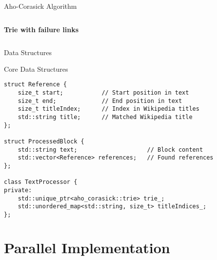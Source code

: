 \documentclass[aspectratio=169]{beamer}
\begin{document}
\begin{frame}{Aho-Corasick Algorithm}
\begin{columns}
\begin{column}{0.5\textwidth}
\begin{center}
\end{center}
\textbf{Trie with failure links}
\end{column}
\end{columns}
\end{frame}

\begin{frame}[fragile]{Data Structures}
\begin{block}{Core Data Structures}
\begin{verbatim}
struct Reference {
    size_t start;           // Start position in text
    size_t end;             // End position in text
    size_t titleIndex;      // Index in Wikipedia titles
    std::string title;      // Matched Wikipedia title
};

struct ProcessedBlock {
    std::string text;                    // Block content
    std::vector<Reference> references;   // Found references
};

class TextProcessor {
private:
    std::unique_ptr<aho_corasick::trie> trie_;
    std::unordered_map<std::string, size_t> titleIndices_;
};
\end{verbatim}
\end{block}
\end{frame}

\section{Parallel Implementation}
\end{document}

